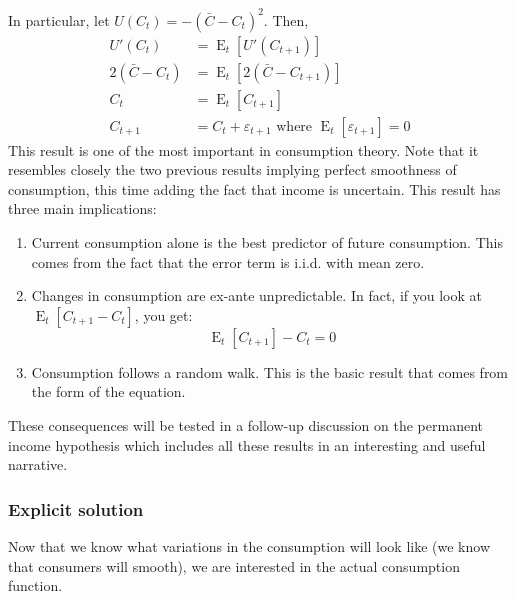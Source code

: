 \documentclass[12pt]{report}
\newcommand{\Et}[1]{\operatorname{E}_t\left[#1\right]}
\begin{document}
In particular, let $U(C_t) = -(\bar C - C_t)^2$. Then, \begin{align*}
U'(C_t) & = \Et{U'(C_{t+1})} \\
2(\bar C - C_t) & = \Et{2(\bar C - C_{t+1})} \\
C_t & = \Et{C_{t+1}}\\
C_{t+1} & = C_t + \varepsilon_{t+1} \text{ where } \Et{\varepsilon_{t+1}} = 0
\end{align*} This result is one of the most important in consumption theory. Note that it resembles closely the two previous results implying perfect smoothness of consumption, this time adding the fact that income is uncertain. This result has three main implications:\begin{enumerate}
\item Current consumption alone is the best predictor of future consumption. This comes from the fact that the error term is i.i.d. with mean zero.
\item Changes in consumption are ex-ante unpredictable. In fact, if you look at $\Et{C_{t+1} - C_t}$, you get: $$ \Et{C_{t+1}} - C_t = 0 $$
\item Consumption follows a random walk. This is the basic result that comes from the form of the equation.
\end{enumerate}

These consequences will be tested in a follow-up discussion on the permanent income hypothesis which includes all these results in an interesting and useful narrative.

\subsubsection{Explicit solution}

Now that we know what variations in the consumption will look like (we know that consumers will smooth), we are interested in the actual consumption function.
\end{document}
